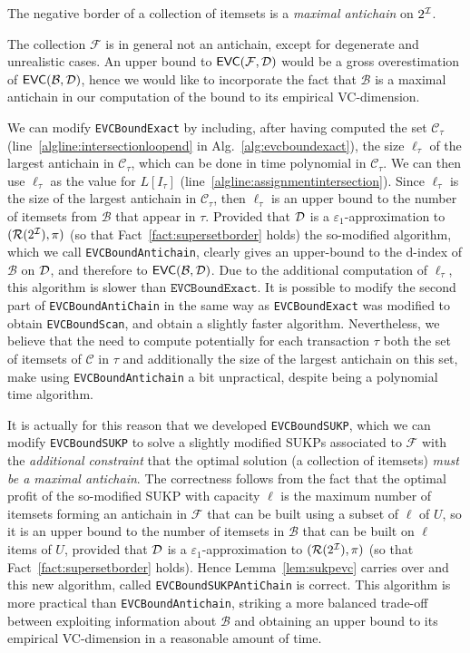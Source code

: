 \begin{fact}
	The negative border of a collection of itemsets is a \emph{maximal
	antichain} on $2^{\cal I}$.
\end{fact}

The collection $\mathcal{F}$ is in general not an antichain, except for
degenerate and unrealistic cases. An upper bound to $\mathsf{EVC}(\mathcal{F},{\cal D})$
would be a gross overestimation of $\mathsf{EVC}(\mathcal{B},{\cal D})$, hence we would like
to incorporate the fact that $\mathcal{B}$ is a maximal antichain in our
computation of the bound to its empirical VC-dimension.

We can modify \texttt{EVCBoundExact} by including, after having computed the
set $\mathcal{C}_\tau$ (line~\ref{algline:intersectionloopend} in
Alg.~\ref{alg:evcboundexact}), the size $\ell_\tau$ of the largest antichain in
$\mathcal{C}_\tau$, which can be done in time polynomial in $\mathcal{C}_\tau$.
We can then use $\ell_\tau$ as the value for $L[I_\tau]$
(line~\ref{algline:assignmentintersection}). Since $\ell_\tau$ is the size of
the largest antichain in $\mathcal{C}_\tau$, then $\ell_\tau$ is an upper bound
to the number of itemsets from $\mathcal{B}$ that appear in $\tau$. Provided
that ${\cal D}$ is a $\varepsilon_1$-approximation to $(\mathcal{R}(2^{\cal I}),\pi)$ (so
that Fact~\ref{fact:supersetborder} holds) the so-modified algorithm, which we
call \texttt{EVCBoundAntichain}, clearly gives an upper-bound to the d-index of
$\mathcal{B}$ on ${\cal D}$, and therefore to $\mathsf{EVC}(\mathcal{B},{\cal D})$. Due to the
additional computation of $\ell_\tau$, this algorithm is slower than
$\texttt{EVCBoundExact}$. It is possible to modify the second part of
\texttt{EVCBoundAntiChain} in the same way as \texttt{EVCBoundExact} was
modified to obtain \texttt{EVCBoundScan}, and obtain a slightly faster
algorithm. Nevertheless, we believe that the need to compute potentially for
each transaction $\tau$ both the set of itemsets of $\mathcal{C}$ in $\tau$ and
additionally the size of the largest antichain on this set, make using
\texttt{EVCBoundAntichain} a bit unpractical, despite being a polynomial time
algorithm.

It is actually for this reason that we developed \texttt{EVCBoundSUKP}, which we
can modify \texttt{EVCBoundSUKP} to solve a slightly modified SUKPs associated
to $\mathcal{F}$ with the \emph{additional constraint} that the optimal solution
(a collection of itemsets) \emph{must be a maximal antichain}. The correctness
follows from the fact that the optimal profit of the so-modified SUKP with
capacity $\ell$ is the maximum number of itemsets forming an antichain in
$\mathcal{F}$ that can be built using a subset of $\ell$ of $U$, so it is an
upper bound to the number of itemsets in $\mathcal{B}$ that can be built on
$\ell$ items of $U$, provided that ${\cal D}$ is a $\varepsilon_1$-approximation to
$(\mathcal{R}(2^{\cal I}),\pi)$ (so that Fact~\ref{fact:supersetborder} holds). Hence
Lemma~\ref{lem:sukpevc} carries over and this new algorithm, called
\texttt{EVCBoundSUKPAntiChain} is correct. This algorithm is more practical than
\texttt{EVCBoundAntichain}, striking a more balanced trade-off between
exploiting information about $\mathcal{B}$ and obtaining an upper bound to its
empirical VC-dimension in a reasonable amount of time.

